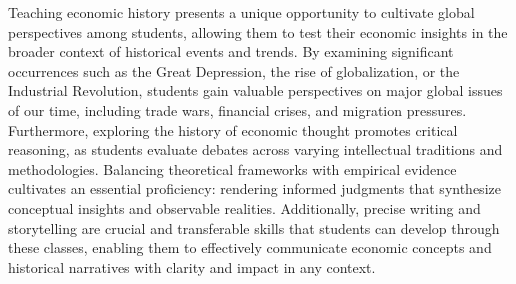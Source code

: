 \documentclass{article}
\begin{document}
\medskip 


Teaching economic history presents a unique opportunity to cultivate global perspectives among students, allowing them to test their economic insights in the broader context of historical events and trends. By examining significant occurrences such as the Great Depression, the rise of globalization, or the Industrial Revolution, students gain valuable perspectives on major global issues of our time, including trade wars, financial crises, and migration pressures. Furthermore, exploring the history of economic thought promotes critical reasoning, as students evaluate debates across varying intellectual traditions and methodologies. Balancing theoretical frameworks with empirical evidence cultivates an essential proficiency: rendering informed judgments that synthesize conceptual insights and observable realities. Additionally, precise writing and storytelling are crucial and transferable skills that students can develop through these classes, enabling them to effectively communicate economic concepts and historical narratives with clarity and impact in any context.
\end{document}
